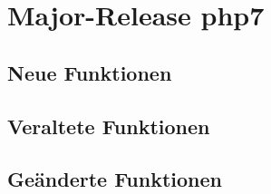 \chapter{Major-Release php7}\label{ch:taetigkeiten}

\section{Neue Funktionen}

\section{Veraltete Funktionen}

\section{Geänderte Funktionen}